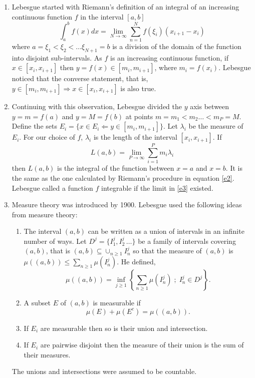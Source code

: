\documentclass{article}
\theoremstyle{plain}
\numberwithin{thm}{section}
\theoremstyle{plain}
\numberwithin{prop}{section}
\theoremstyle{definition}
\numberwithin{defn}{section}
\theoremstyle{remark}
\begin{document}
\begin{enumerate}
\item Lebesgue started with Riemann's definition of an integral of an 
increasing continuous function $f$ in the interval $[a, b]$
\begin{equation}\label{e2}
\int_a^b f(x)dx = 
\lim_{N \rightarrow \infty}\sum_{n=1}^N f(\xi_i)(x_{i+1} - x_i)
\end{equation}
where $a = \xi_1 < \xi_2 < \ldots \xi_{N+1} = b$ is a division of the domain
of the function into disjoint sub-intervals. As $f$ is an increasing continuous
function, if $x \in [x_i, x_{i+1}]$ then $y = f(x) \in [m_i, m_{i+1}]$, where
$m_i = f(x_i)$. Lebesgue noticed that the converse statement, that is, $y \in
[m_i, m_{i+1}] \Rightarrow x \in [x_i, x_{i+1}]$ is also true.

\item Continuing with this observation, Lebesgue divided the $y$ axis between
$y = m = f(a)$ and $y = M = f(b)$ at points $m = m_1 < m_2 \ldots < m_P = M$.
Define the sets $E_i = \{x \in E_i \Leftarrow y \in [m_i, m_{i+1}]\}$. Let 
$\lambda_i$ be the measure of $E_i$. For our choice of $f$, $\lambda_i$ is the
length of the interval $[x_i, x_{i+1}]$. If
\begin{equation}\label{e3}
L(a, b) = \lim_{P \rightarrow \infty}\sum_{i=1}^P m_i\lambda_i
\end{equation}
then $L(a, b)$ is the integral of the function between $x=a$ and $x=b$. It is
the same as the one calculated by Riemann's procedure in equation \eqref{e2}.
Lebesgue called a function $f$ integrable if the limit in \eqref{e3} existed.

\item Measure theory was introduced by 1900. Lebesgue used the following ideas
from measure theory:
\begin{enumerate}
\item The interval $(a, b)$ can be written as a union of intervals in an
infinite number of ways. Let $D^j = \{I^j_1, I^j_2\, \ldots\}$ be a family of
intervals covering $(a, b)$, that is $(a, b) \subseteq \cup_{n \ge 1}I^j_n$ so 
that the measure of $(a, b)$ is $\mu((a, b)) \le \sum_{n\ge 1}\mu(I^j_n)$. He 
defined,
\begin{equation}\label{e4}
\mu((a, b)) = 
\inf_{j \ge 1}\left\{\sum_{n \ge 1}\mu(I^j_n)\;;\; I^j_n \in D^j\right\}.
\end{equation}
\item A subset $E$ of $(a, b)$ is measurable if 
\begin{equation}\label{e5}
\mu(E) + \mu(E^c) = \mu((a,b)).
\end{equation}
\item If $E_i$ are measurable then so is their union and intersection.
\item If $E_i$ are pairwise disjoint then the measure of their union is the
sum of their measures.
\end{enumerate}
The unions and intersections were assumed to be countable.


\end{enumerate}
\end{document}
